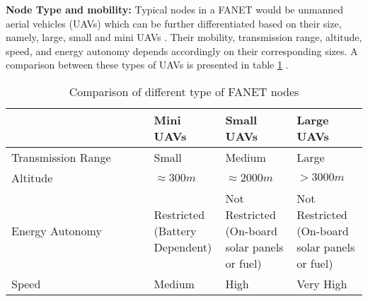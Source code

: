 \textbf{Node Type and mobility:} Typical nodes in a FANET would be unmanned aerial vehicles (UAVs) which can be further differentiated based on their size, namely, large, small and mini UAVs \cite{OUBBATI201729}. Their mobility, transmission range, altitude, speed, and energy autonomy depends accordingly on their corresponding sizes. A comparison between these types of UAVs is presented in table \ref{tab:uav_comparison} \cite{OUBBATI201729}.
\begin{table}
\caption{Comparison of different type of FANET nodes}
\label{tab:uav_comparison}
\begin{tabular}{|p{0.4\linewidth}|p{0.2\linewidth}|p{0.2\linewidth}|p{0.2\linewidth}|}}
\toprule
Properties & Mini UAVs & Small UAVs & Large UAVs\\
\midrule
Transmission Range & Small & Medium & Large\\
Altitude 	& $ \approx 300 m$ & $ \approx 2000 m$ & $> 3000 m$ \\
Energy Autonomy & Restricted (Battery Dependent) & Not Restricted (On-board solar panels or fuel) &  Not Restricted (On-board solar panels or fuel) \\
Speed & Medium & High & Very High \\
\bottomrule
\end{tabular}
\end{table}
